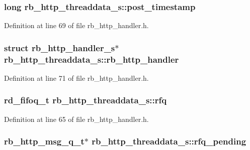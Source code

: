 \subsubsection[{post\+\_\+timestamp}]{\setlength{\rightskip}{0pt plus 5cm}long rb\+\_\+http\+\_\+threaddata\+\_\+s\+::post\+\_\+timestamp}\label{structrb__http__threaddata__s_a67e29737b4f8a0be3bdc23a22fed5a0c}


Definition at line 69 of file rb\+\_\+http\+\_\+handler.\+h.

\hypertarget{structrb__http__threaddata__s_a64b0cd10601b009f295181fabe882a3f}{}
\subsubsection[{rb\+\_\+http\+\_\+handler}]{\setlength{\rightskip}{0pt plus 5cm}struct {\bf rb\+\_\+http\+\_\+handler\+\_\+s}$\ast$ rb\+\_\+http\+\_\+threaddata\+\_\+s\+::rb\+\_\+http\+\_\+handler}\label{structrb__http__threaddata__s_a64b0cd10601b009f295181fabe882a3f}


Definition at line 71 of file rb\+\_\+http\+\_\+handler.\+h.

\hypertarget{structrb__http__threaddata__s_a00e385e1aa5823aee8d3db72936956e2}{}
\subsubsection[{rfq}]{\setlength{\rightskip}{0pt plus 5cm}rd\+\_\+fifoq\+\_\+t rb\+\_\+http\+\_\+threaddata\+\_\+s\+::rfq}\label{structrb__http__threaddata__s_a00e385e1aa5823aee8d3db72936956e2}


Definition at line 65 of file rb\+\_\+http\+\_\+handler.\+h.

\hypertarget{structrb__http__threaddata__s_abb3c07fa38012811cf4be59ef72b4748}{}
\subsubsection[{rfq\+\_\+pending}]{\setlength{\rightskip}{0pt plus 5cm}rb\+\_\+http\+\_\+msg\+\_\+q\+\_\+t$\ast$ rb\+\_\+http\+\_\+threaddata\+\_\+s\+::rfq\+\_\+pending}\label{structrb__http__threaddata__s_abb3c07fa38012811cf4be59ef72b4748}


